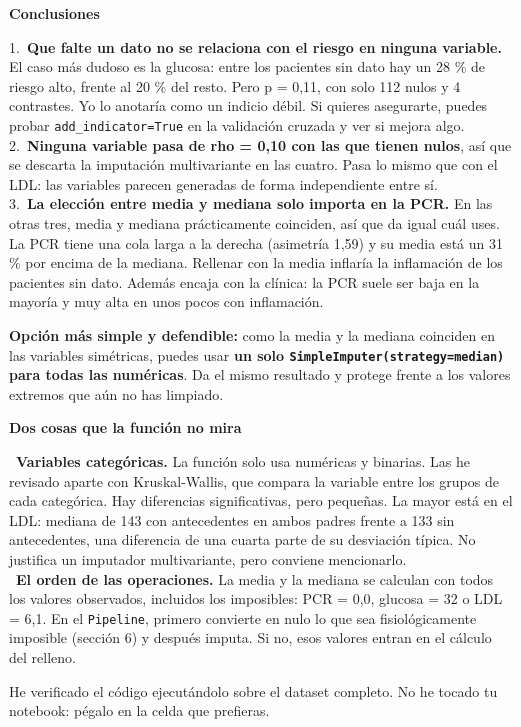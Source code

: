 \documentclass[11pt,a4paper]{article}
\begin{document}
{\smallskip\noindent\textbf{Conclusiones}\par
\hspace*{1.0em}1.~\textbf{Que falte un dato no se relaciona con el riesgo en ninguna variable.} El caso más dudoso es la glucosa: entre los pacientes sin dato hay un 28 \% de riesgo alto, frente al 20 \% del resto. Pero p = 0,11, con solo 112 nulos y 4 contrastes. Yo lo anotaría como un indicio débil. Si quieres asegurarte, puedes probar \texttt{add\_\allowbreak{}indicator=True} en la validación cruzada y ver si mejora algo. \\{}
\hspace*{1.0em}2.~\textbf{Ninguna variable pasa de rho = 0,10 con las que tienen nulos}, así que se descarta la imputación multivariante en las cuatro. Pasa lo mismo que con el LDL: las variables parecen generadas de forma independiente entre sí. \\{}
\hspace*{1.0em}3.~\textbf{La elección entre media y mediana solo importa en la PCR.} En las otras tres, media y mediana prácticamente coinciden, así que da igual cuál uses. La PCR tiene una cola larga a la derecha (asimetría 1,59) y su media está un 31 \% por encima de la mediana. Rellenar con la media inflaría la inflamación de los pacientes sin dato. Además encaja con la clínica: la PCR suele ser baja en la mayoría y muy alta en unos pocos con inflamación.

\textbf{Opción más simple y defendible:} como la media y la mediana coinciden en las variables simétricas, puedes usar \textbf{un solo \texttt{SimpleImputer(strategy=\textquotedbl{}median\textquotedbl{})} para todas las numéricas}. Da el mismo resultado y protege frente a los valores extremos que aún no has limpiado.

\smallskip\noindent\textbf{Dos cosas que la función no mira}\par
\hspace*{1.0em}\textbullet~\textbf{Variables categóricas.} La función solo usa numéricas y binarias. Las he revisado aparte con Kruskal-Wallis, que compara la variable entre los grupos de cada categórica. Hay diferencias significativas, pero pequeñas. La mayor está en el LDL: mediana de 143 con antecedentes en ambos padres frente a 133 sin antecedentes, una diferencia de una cuarta parte de su desviación típica. No justifica un imputador multivariante, pero conviene mencionarlo. \\{}
\hspace*{1.0em}\textbullet~\textbf{El orden de las operaciones.} La media y la mediana se calculan con todos los valores observados, incluidos los imposibles: PCR = 0,0, glucosa = 32 o LDL = 6,1. En el \texttt{Pipeline}, primero convierte en nulo lo que sea fisiológicamente imposible (sección 6) y después imputa. Si no, esos valores entran en el cálculo del relleno.

He verificado el código ejecutándolo sobre el dataset completo. No he tocado tu notebook: pégalo en la celda que prefieras.

}
\end{document}
